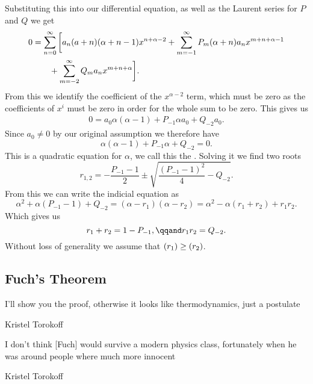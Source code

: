 \documentclass[fleqn]{NotesClass}
\let\Re\relax
\DeclareMathOperator{\Re}{Re}
\begin{document}
    Substituting this into our differential equation, as well as the Laurent series for \(P\) and \(Q\) we get
    \begin{align}\label{eqn:sub in frobenius}
        0 &= \sum_{n=0}^{\infty} \bigg[ a_n(a + n)(\alpha + n - 1)x^{n + \alpha - 2} + \sum_{m=-1}^{\infty} P_m(\alpha + n)a_nx^{m + n + \alpha - 1} \notag\\
        &\qquad+ \sum_{m=-2}^{\infty} Q_ma_n x^{m + n + \alpha} \bigg].
    \end{align}
    From this we identify the coefficient of the \(x^{\alpha - 2}\) term, which must be zero as the coefficients of \(x^i\) must be zero in order for the whole sum to be zero.
    This gives us
    \begin{align}
        0 = a_0\alpha(\alpha - 1) + P_{-1}\alpha a_0 + Q_{-2}a_0.
    \end{align}
    Since \(a_0 \ne 0\) by our original assumption we therefore have
    \begin{equation}
        \alpha(\alpha - 1) + P_{-1}\alpha + Q_{-2} = 0.
    \end{equation}
    This is a quadratic equation for \(\alpha\), we call this the .
    Solving it we find two roots
    \begin{equation}
        r_{1,2} = -\frac{P_{-1} - 1}{2} \pm \sqrt{\frac{(P_{-1} - 1)^2}{4} - Q_{-2}}.
    \end{equation}
    From this we can write the indicial equation as
    \begin{equation}
        \alpha^2 + \alpha(P_{-1} - 1) + Q_{-2} = (\alpha - r_1)(\alpha - r_2) = \alpha^2 - \alpha(r_1+r_2) + r_1r_2.
    \end{equation}
    Which gives us
    \begin{equation}
        r_1 + r_2 = 1 - P_{-1}, \qqand r_1 r_2 = Q_{-2}.
    \end{equation}
    Without loss of generality we assume that \(\Re(r_1) \ge \Re(r_2)\).
    
    \subsection{Fuch's Theorem}
    \epigraph{I'll show you the proof, otherwise it looks like thermodynamics, just a postulate}{Kristel Torokoff}
    \epigraph{I don't think [Fuch] would survive a modern physics class, fortunately when he was around people where much more innocent}{Kristel Torokoff}
    
\end{document}
